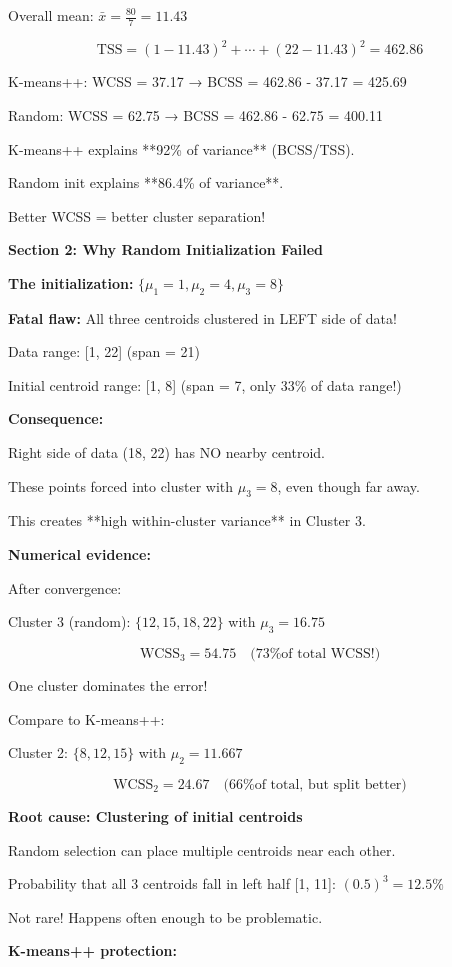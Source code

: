 \documentclass[12pt]{article}
\begin{document}
\begin{explanation}
Overall mean: $\bar{x} = \frac{80}{7} = 11.43$

\[
\text{TSS} = (1-11.43)^2 + \cdots + (22-11.43)^2 = 462.86
\]

K-means++: WCSS = 37.17 → BCSS = 462.86 - 37.17 = 425.69

Random: WCSS = 62.75 → BCSS = 462.86 - 62.75 = 400.11

K-means++ explains **92\% of variance** (BCSS/TSS).

Random init explains **86.4\% of variance**.

Better WCSS = better cluster separation!

\textbf{Section 2: Why Random Initialization Failed}

\textbf{The initialization:} $\{\mu_1=1, \mu_2=4, \mu_3=8\}$

\textbf{Fatal flaw:} All three centroids clustered in LEFT side of data!

Data range: [1, 22] (span = 21)

Initial centroid range: [1, 8] (span = 7, only 33\% of data range!)

\textbf{Consequence:}

Right side of data (18, 22) has NO nearby centroid.

These points forced into cluster with $\mu_3=8$, even though far away.

This creates **high within-cluster variance** in Cluster 3.

\textbf{Numerical evidence:}

After convergence:

Cluster 3 (random): $\{12, 15, 18, 22\}$ with $\mu_3=16.75$

\[
\text{WCSS}_3 = 54.75 \quad \text{(73\% of total WCSS!)}
\]

One cluster dominates the error!

Compare to K-means++:

Cluster 2: $\{8, 12, 15\}$ with $\mu_2=11.667$

\[
\text{WCSS}_2 = 24.67 \quad \text{(66\% of total, but split better)}
\]

\textbf{Root cause: Clustering of initial centroids}

Random selection can place multiple centroids near each other.

Probability that all 3 centroids fall in left half [1, 11]: $(0.5)^3 = 12.5\%$

Not rare! Happens often enough to be problematic.

\textbf{K-means++ protection:}


\end{explanation}
\end{document}
